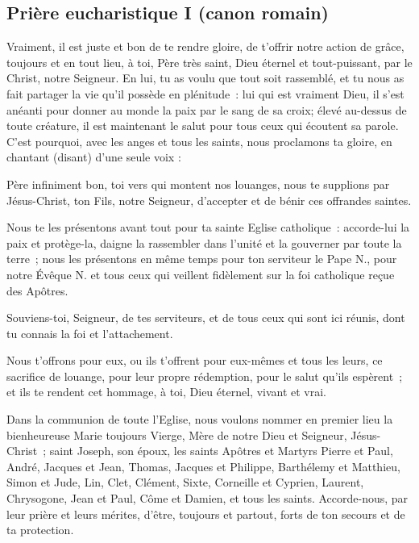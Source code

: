 \subsection*{Prière eucharistique I (canon romain)}\label{pe1} 

Vraiment, il est juste et bon de te rendre gloire, de t'offrir notre action 
de grâce, toujours et en tout lieu, à toi, Père très saint, Dieu éternel et
 tout-puissant, par le Christ, notre Seigneur. En lui, tu as voulu que tout 
soit rassemblé, et tu nous as fait partager la vie qu'il possède en plénitude~: 
lui qui est vraiment Dieu, il s'est anéanti pour donner au monde la paix par 
le sang de sa croix; élevé au-dessus de toute créature, il est maintenant 
le salut pour tous ceux qui écoutent sa parole. C'est pourquoi, avec les anges 
et tous les saints, nous proclamons ta gloire, en chantant (disant) d'une seule voix :






Père infiniment bon, toi vers qui montent nos louanges, nous te supplions
par Jésus-Christ, ton Fils, notre Seigneur,  d'accepter et de bénir 
ces offrandes saintes.

Nous te les présentons avant tout pour ta sainte Eglise catholique~:
accorde-lui la paix et protège-la, daigne la rassembler dans l'unité et la
gouverner par toute la terre~; nous les présentons en même temps pour ton
serviteur le Pape N., pour notre Évêque N. et tous ceux
qui veillent fidèlement sur la foi catholique reçue des Apôtres.

Souviens-toi, Seigneur, de tes serviteurs, et de tous 
ceux qui sont ici réunis, dont tu connais la foi et l'attachement. 


Nous t'offrons pour eux, ou ils t'offrent pour eux-mêmes et tous les leurs, ce
sacrifice de louange, pour leur propre rédemption, pour le salut qu'ils
espèrent~; et ils te rendent cet hommage, à toi, Dieu éternel, vivant et
vrai.

Dans la communion de toute l'Eglise, nous voulons nommer en premier lieu la
bienheureuse Marie toujours Vierge, Mère de notre Dieu et Seigneur,
Jésus-Christ~; saint Joseph, son époux, les saints Apôtres et Martyrs Pierre
et Paul, André, Jacques et Jean, Thomas, Jacques et Philippe, Barthélemy et
Matthieu, Simon et Jude, Lin, Clet, Clément, Sixte, Corneille et Cyprien,
Laurent, Chrysogone, Jean et Paul, Côme et Damien, et tous les saints.
Accorde-nous, par leur prière et leurs mérites, d'être, toujours et partout,
forts de ton secours et de ta protection.

